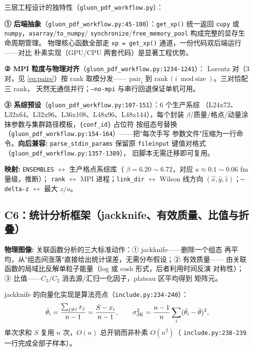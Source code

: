 \documentclass[UTF8]{ctexart}
\begin{document}
三层工程设计的独特性（\texttt{gluon\_pdf\_workflow.py}）：

\textbf{① 后端抽象}（\texttt{\nolinkurl{gluon\_pdf\_workflow.py:45-100}}）：\texttt{get\_xp()}
统一返回 \texttt{cupy} 或 \texttt{numpy}，\texttt{asarray}/\texttt{to\_numpy}/
\texttt{synchronize}/\texttt{free\_memory\_pool} 构成完整的显存生命周期管理。
物理核心函数全部走 \texttt{xp = get\_xp()} 通道，一份代码双后端运行——对比
朴素实现（GPU/CPU 两套代码）是显著工程优势。

\textbf{② MPI 粒度与物理对齐}（\texttt{\nolinkurl{gluon\_pdf\_workflow.py:1234-1241}}）：
Lorentz 对（3 对，见 \eqref{eq:pairs}）按 rank 取模分发——
$\text{pair}_i$ 到 $\text{rank}\,(i \bmod \text{size})$。三对恰配三 rank，
天然无通信并行；\texttt{--no-mpi} 与串行回退保证单机可用。

\textbf{③ 系综预设}（\texttt{\nolinkurl{gluon\_pdf\_workflow.py:107-151}}）：6 个生产系综
（L24x72、L32x64、L32x96、L36x108、L48x96、L48x144），每个封装
$\beta$/质量/格点/动量涂抹参数与集群路径模板，\texttt{\{conf\_id\}} 占位符
按组态号替换（\texttt{\nolinkurl{gluon\_pdf\_workflow.py:154-164}}）——把"每次手写
参数文件"压缩为一行命令。\textbf{向后兼容:} \texttt{parse\_stdin\_params}
保留原 \texttt{fileinput} 键值对格式（\texttt{\nolinkurl{gluon\_pdf\_workflow.py:1357-1389}}），
旧脚本无需迁移即可复用。

\begin{mapbox}
\textbf{映射:} \texttt{ENSEMBLES} $\leftrightarrow$ 生产格点系综库（
$\beta=6.20\sim6.72$，对应 $a\approx0.1\sim0.06$ fm 量级，推断）；
\texttt{rank} $\leftrightarrow$ MPI 进程；\texttt{link\_dir} $\leftrightarrow$
Wilson 线方向 $(\hat x,\hat y,\hat z)$；\texttt{--delta-z} $\leftrightarrow$
最大 $z/a$。
\end{mapbox}

\subsection{C6：统计分析框架（jackknife、有效质量、比值与折叠）}

\begin{physbox}
\textbf{物理图像:} 关联函数分析的三大标准动作：① jackknife——删除一个组态
再平均，从"组态间涨落"直接给出统计误差，无需分布假设；② 有效质量——
由关联函数的局域比反解单粒子能量（log 或 cosh 形式，后者利用时间反演
对称性）；③ 比值——$C_3/C_2$ 消去源/汇归一化因子，plateau 区平均得到
矩阵元。
\end{physbox}

jackknife 的向量化实现是算法亮点（\texttt{\nolinkurl{include.py:234-240}}）：
\begin{equation}\label{eq:jk}
\bar\theta_i = \frac{\sum_{j\neq i} x_j}{n-1} = \frac{S - x_i}{n-1},
\qquad
\sigma_{\rm JK}^2 = \frac{n-1}{n}\sum_i(\bar\theta_i-\bar\theta)^2 ,
\end{equation}
单次求和 $S$ 复用 $n$ 次，$O(n)$ 总开销而非朴素 $O(n^2)$（
\texttt{\nolinkurl{include.py:238-239}} 一行完成全部子样本）。
\end{document}
